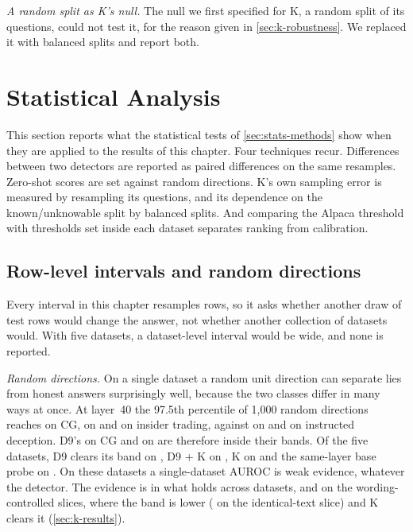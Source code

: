 \emph{A random split as K's null.} The null we first specified for K, a random split of its
questions, could not test it, for the reason given in \cref{sec:k-robustness}. We replaced it with
balanced splits and report both.

\FloatBarrier
\section{Statistical Analysis}
\label{sec:stats}

This section reports what the statistical tests of \cref{sec:stats-methods} show when they are
applied to the results of this chapter. Four techniques recur. Differences between two detectors are
reported as paired differences on the same resamples. Zero-shot scores are set against random
directions. K's own sampling error is measured by resampling its questions, and its dependence on the
known/unknowable split by balanced splits. And comparing the Alpaca threshold with thresholds set inside
each dataset separates ranking from calibration.

\subsection{Row-level intervals and random directions}
\label{sec:stats-nulls}

Every interval in this chapter resamples rows, so it asks whether another draw of test rows would
change the answer, not whether another collection of datasets would. With five datasets, a
dataset-level interval would be wide, and none is reported.

\emph{Random directions.} On a single dataset a random unit direction can separate lies from honest
answers surprisingly well, because the two classes differ in many ways at once. At layer~40 the
97.5th percentile of 1,000 random directions reaches  on CG,  on
\hpkr{} and  on insider trading, against  on \hpc{} and
 on instructed deception. D9's  on CG and  on
\hpkr{} are therefore inside their bands. Of the five datasets, D9 clears its band on
, D9 + K on , K on  and the same-layer
base probe on . On these datasets a single-dataset AUROC is weak evidence,
whatever the detector. The evidence is in what holds across datasets, and on the wording-controlled
slices, where the band is lower ( on the identical-text slice) and K clears it
(\cref{sec:k-results}).

